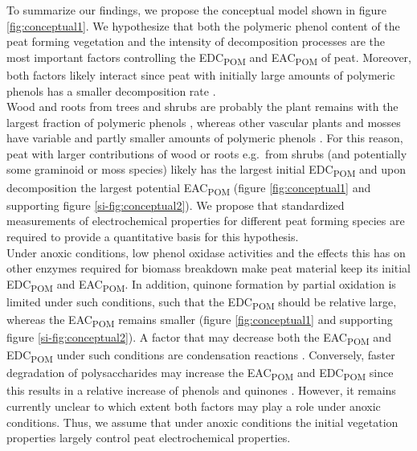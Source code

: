 \documentclass[draft,linenumbers]{agujournal2018}
\begin{document}
To summarize our findings, we propose the conceptual model shown in
figure \ref{fig:conceptual1}. We hypothesize that both the polymeric
phenol content of the peat forming vegetation and the intensity of
decomposition processes are the most important factors controlling the
EDC\textsubscript{POM} and EAC\textsubscript{POM} of peat. Moreover,
both factors likely interact since peat with initially large amounts of
polymeric phenols has a smaller decomposition rate
\citep{Bengtsson.2018}.\\
Wood and roots from trees and shrubs are probably the plant remains with
the largest fraction of polymeric phenols
\citep{Benner.1984, Williams.1998, Strakova.2010, Hodgkins.2018},
whereas other vascular plants and mosses have variable and partly
smaller amounts of polymeric phenols
\citep{Williams.1998, Scheffer.2001, Strakova.2010, Bengtsson.2018, Zak.2019}.
For this reason, peat with larger contributions of wood or roots
e.g.~from shrubs (and potentially some graminoid or moss species) likely
has the largest initial EDC\textsubscript{POM} and upon decomposition
the largest potential EAC\textsubscript{POM} (figure
\ref{fig:conceptual1} and supporting figure \ref{si-fig:conceptual2}).
We propose that standardized measurements of electrochemical properties
for different peat forming species are required to provide a
quantitative basis for this hypothesis.\\
Under anoxic conditions, low phenol oxidase activities and the effects
this has on other enzymes required for biomass breakdown
\citep{Fenner.2011} make peat material keep its initial
EDC\textsubscript{POM} and EAC\textsubscript{POM}. In addition, quinone
formation by partial oxidation is limited under such conditions, such
that the EDC\textsubscript{POM} should be relative large, whereas the
EAC\textsubscript{POM} remains smaller (figure \ref{fig:conceptual1} and
supporting figure \ref{si-fig:conceptual2}). A factor that may decrease
both the EAC\textsubscript{POM} and EDC\textsubscript{POM} under such
conditions are condensation reactions
\citep{Hotta.2002, Uchimiya.2009, Bolton.2018, Zhao.2020, Olk.2006, Heitmann.2006, Yu.2016}.
Conversely, faster degradation of polysaccharides may increase the
EAC\textsubscript{POM} and EDC\textsubscript{POM} since this results in
a relative increase of phenols and quinones \citep{Benner.1984}.
However, it remains currently unclear to which extent both factors may
play a role under anoxic conditions. Thus, we assume that under anoxic
conditions the initial vegetation properties largely control peat
electrochemical properties.\\
\end{document}
